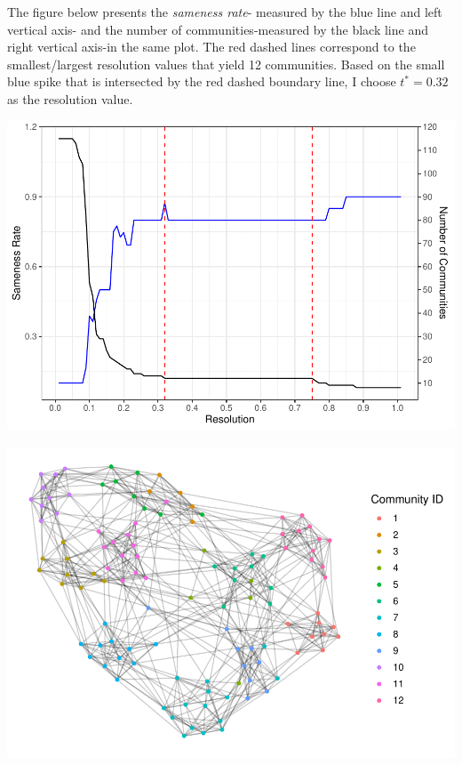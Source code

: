 \documentclass[
]{article}
\begin{document}
The figure below presents the \emph{sameness rate}- measured by the blue
line and left vertical axis- and the number of communities-measured by
the black line and right vertical axis-in the same plot. The red dashed
lines correspond to the smallest/largest resolution values that yield 12
communities. Based on the small blue spike that is intersected by the
red dashed boundary line, I choose \(t^*=0.32\) as the resolution value.

\includegraphics{communities_writeup_files/figure-latex/unnamed-chunk-6-1.pdf}

\includegraphics{communities_writeup_files/figure-latex/unnamed-chunk-8-1.pdf}
\end{document}
